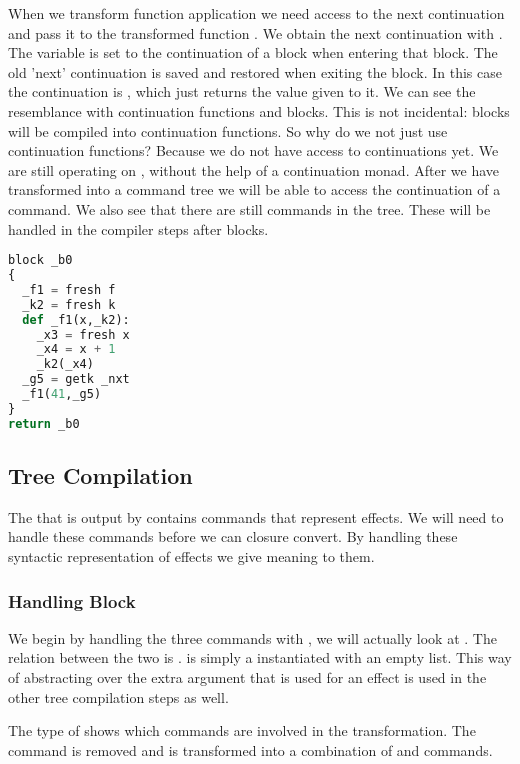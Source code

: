 When we transform function application we need access to the next continuation and pass it to the transformed function . We obtain the next continuation with . The variable  is set to the continuation of a block when entering that block. The old 'next' continuation is saved and restored when exiting the block. In this case the continuation is , which just returns the value given to it. We can see the resemblance with continuation functions and blocks. This is not incidental: blocks will be compiled into continuation functions. So why do we not just use continuation functions? Because we do not have access to continuations yet. We are still operating on , without the help of a continuation monad. After we have transformed into a command tree we will be able to access the continuation of a command. We also see that there are still  commands in the tree. These will be handled in the compiler steps after blocks.

\begin{lstlisting}[language=Python]
block _b0
{
  _f1 = fresh f
  _k2 = fresh k
  def _f1(x,_k2):
    _x3 = fresh x
    _x4 = x + 1
    _k2(_x4)
  _g5 = getk _nxt
  _f1(41,_g5)
}
return _b0
\end{lstlisting}

\subsection{\label{subsection:semtosyn}Tree Compilation}
The  that is output by  contains commands that represent effects. We will need to handle these commands before we can closure convert. By handling these syntactic representation of effects we give meaning to them.

\subsubsection{\label{subsection:hblock}Handling Block}
We begin by handling the three  commands with , we will actually look at . The relation between the two is .  is simply a  instantiated with an empty list. This way of abstracting over the extra argument that is used for an effect is used in the other tree compilation steps as well.

The type of  shows which commands are involved in the transformation. The  command is removed and is transformed into a combination of  and  commands.


